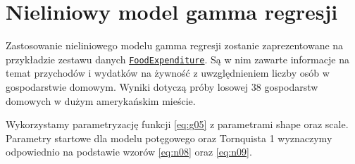 \documentclass[polish,]{book}
\begin{document}
\hypertarget{R33}{%
\section{Nieliniowy model gamma regresji}\label{R33}}

Zastosowanie nieliniowego modelu gamma regresji zostanie zaprezentowane na przykładzie zestawu danych \href{https://rdrr.io/rforge/betareg/man/FoodExpenditure.html}{\texttt{FoodExpenditure}}. Są w nim zawarte informacje na temat przychodów i wydatków na żywność z uwzględnieniem liczby osób w gospodarstwie domowym. Wyniki dotyczą próby losowej \(38\) gospodarstw domowych w dużym amerykańskim mieście.

Wykorzystamy parametryzację funkcji \eqref{eq:g05} z parametrami shape oraz scale.
Parametry startowe dla modelu potęgowego oraz Tornquista 1 wyznaczymy odpowiednio na podstawie wzorów \eqref{eq:n08} oraz \eqref{eq:n09}.
\end{document}

